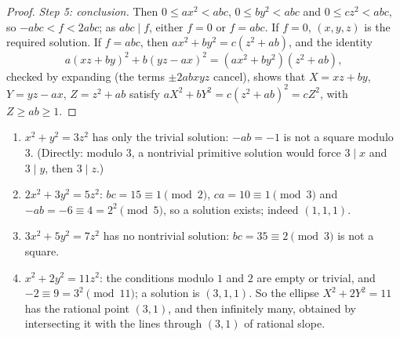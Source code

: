 \begin{proof}
\emph{Step 5: conclusion.} Then $0 \leq ax^2 < abc$, $0 \leq by^2 < abc$ and $0 \leq cz^2 < abc$, so $-abc < f < 2abc$; as $abc \mid f$, either $f = 0$ or $f = abc$. If $f = 0$, $(x, y, z)$ is the required
solution. If $f = abc$, then $ax^2 + by^2 = c(z^2 + ab)$, and the identity
\[
a(xz + by)^2 + b(yz - ax)^2 = (ax^2 + by^2)(z^2 + ab),
\]
checked by expanding (the terms $\pm2abxyz$ cancel), shows that $X = xz + by$, $Y = yz - ax$, $Z = z^2 + ab$ satisfy $aX^2 + bY^2 = c(z^2 + ab)^2 = cZ^2$, with $Z \geq ab \geq 1$.
\end{proof}

\begin{example}\label{geometry-of-numbers:example-legendre}
\begin{enumerate}
\item $x^2 + y^2 = 3z^2$ has only the trivial solution: $-ab = -1$ is not a square modulo $3$. (Directly: modulo $3$, a nontrivial primitive solution would force $3 \mid x$ and $3 \mid y$, then $3 \mid z$.)
\item $2x^2 + 3y^2 = 5z^2$: $bc = 15 \equiv 1 \pmod 2$, $ca = 10 \equiv 1 \pmod 3$ and $-ab = -6 \equiv 4 = 2^2 \pmod 5$, so a solution exists; indeed $(1, 1, 1)$.
\item $3x^2 + 5y^2 = 7z^2$ has no nontrivial solution: $bc = 35 \equiv 2 \pmod 3$ is not a square.
\item $x^2 + 2y^2 = 11z^2$: the conditions modulo $1$ and $2$ are empty or trivial, and $-2 \equiv 9 = 3^2 \pmod{11}$; a solution is $(3, 1, 1)$. So the ellipse $X^2 + 2Y^2 = 11$ has the rational point
$(3, 1)$, and then infinitely many, obtained by intersecting it with the lines through $(3, 1)$ of rational slope.
\end{enumerate}
\end{example}


